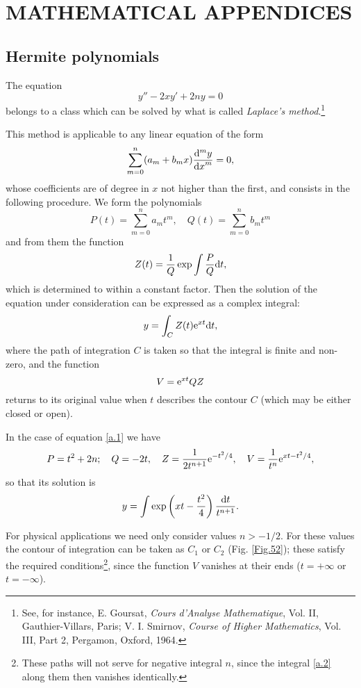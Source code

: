 \chapter{MATHEMATICAL APPENDICES}
\section{Hermite polynomials}\label{Hermite polynomials}
The equation
\begin{equation}\label{a.1}
y''-2xy'+2ny=0
\end{equation}
belongs to a class which can be solved by what is called \textit{Laplace’s method}.\footnote{See, for instance, E. Goursat, \textit{Cours d’Analyse Mathematique}, Vol. II, Gauthier-Villars, Paris; V. I. Smirnov, \textit{Course of Higher Mathematics}, Vol. III, Part 2, Pergamon, Oxford, 1964.
}

This method is applicable to any linear equation of the form
\[ \sum_{m=0}^n(a_m+b_mx)\frac{\mathrm{d}^m y}{{\mathrm{d} x}^m}=0, \]
whose coefficients are of degree in $ x $ not higher than the first, and consists in the following procedure. We form the polynomials
\[ P(t)=\sum_{m=0}^na_mt^m,\quad Q(t)=\sum_{m=0}^nb_mt^m \]
and from them the function
\[ Z(t)=\frac{1}{Q}\exp\int\frac{P}{Q}\mathrm{d} t, \]
which is determined to within a constant factor. Then the solution of the equation under consideration can be expressed as a complex integral:
\[ y=\int_CZ(t)\mathrm{e}^{xt}\mathrm{d} t, \]
where the path of integration $ C $ is taken so that the integral is finite and non-zero, and the function
\[ V=\mathrm{e}^{xt}QZ \]
returns to its original value when $ t $ describes the contour $ C $ (which may be either closed or open).

In the case of equation \eqref{a.1} we have
\[ P=t^2+2n;\quad Q=-2t,\quad Z=\frac{1}{2t^{n+1}}\mathrm{e}^{-t^2/4},\quad V=\frac{1}{t^n}\mathrm{e}^{xt-t^2/4} ,\]
so that its solution is
\begin{equation}\label{a.2}
y=\int\exp\left(xt-\frac{t^2}{4} \right)\frac{\mathrm{d} t}{t^{n+1}}.
\end{equation}



For physical applications we need only consider values $ n > -1/2 $. For these values the contour of integration can be taken as $ C_1 $ or $ C_2 $ (Fig. \ref{Fig.52}); these satisfy the required conditions\footnote{These paths will not serve for negative integral $ n $, since the integral \eqref{a.2} along them then vanishes identically.
}, since the function $ V $ vanishes at their ends ($ t = +\infty $ or $ t = -\infty $).



